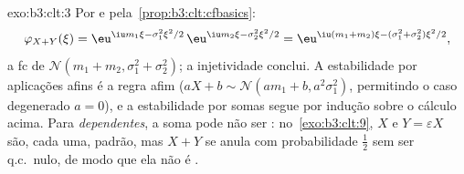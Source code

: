 \begin{solution}{exo:b3:clt:3}
Por  e pela~\cref{prop:b3:clt:cfbasics}:
\[
\varphi_{X+Y}(\xi) = \eu^{\iu m_1\xi - \sigma_1^2\xi^2/2}\,
\eu^{\iu m_2\xi - \sigma_2^2\xi^2/2}
= \eu^{\iu(m_1+m_2)\xi - (\sigma_1^2+\sigma_2^2)\xi^2/2},
\]
a fc de $\mathcal N(m_1 + m_2, \sigma_1^2 + \sigma_2^2)$;
a injetividade conclui. A estabilidade por aplicações afins é a
regra afim ($aX + b \sim \mathcal N(am_1 + b,
a^2\sigma_1^2)$, permitindo o caso degenerado $a = 0$), e a
estabilidade por somas  segue por indução sobre o
cálculo acima. Para  \emph{dependentes}, a soma
pode não ser : no~\cref{exo:b3:clt:9}, $X$ e $Y =
\varepsilon X$ são, cada uma,  padrão, mas $X + Y$
se anula com probabilidade $\frac12$ sem ser q.c.\
nulo, de modo que ela não é .
\end{solution}

